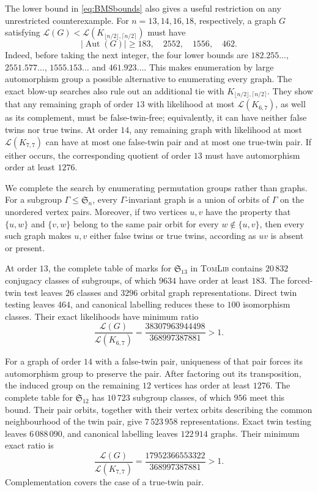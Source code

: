 \documentclass[11pt]{article}
\theoremstyle{definition}
\DeclareMathOperator{\Aut}{Aut}
\newcommand{\Lk}{\mathcal{L}}
\newcommand{\Kbal}{K_{\lfloor n/2\rfloor,\lceil n/2\rceil}}
\begin{document}
The lower bound in \eqref{eq:BMSbounds} also gives a useful restriction on
any unrestricted counterexample.  For $n=13,14,16,18$, respectively, a graph
$G$ satisfying $\Lk(G)<\Lk(\Kbal)$ must have
\[
\lvert\Aut(G)\rvert\ge183,\quad2552,\quad1556,\quad462.
\]
Indeed, before taking the next integer, the four lower bounds are
$182.255\ldots$, $2551.577\ldots$, $1555.153\ldots$ and $461.923\ldots$.
This makes enumeration by large automorphism group a possible alternative to
enumerating every graph.  The exact blow-up searches also rule out an
additional tie with $\Kbal$.  They show that any remaining graph of order
$13$ with likelihood at most $\Lk(K_{6,7})$, as well as its complement, must
be false-twin-free; equivalently, it can have neither false twins nor true
twins.  At order $14$, any remaining graph with likelihood at most
$\Lk(K_{7,7})$ can have at most one false-twin pair and at most one true-twin
pair.  If either occurs, the corresponding quotient of order $13$ must have
automorphism order at least $1276$.

We complete the search by enumerating permutation groups rather than graphs.
For a subgroup $\Gamma\le\mathfrak S_n$, every $\Gamma$-invariant graph is a union of
orbits of $\Gamma$ on the unordered vertex pairs.  Moreover, if two vertices $u,v$
have the property that $\{u,w\}$ and $\{v,w\}$ belong to the same pair orbit
for every $w\notin\{u,v\}$, then every such graph makes $u,v$ either false
twins or true twins, according as $uv$ is absent or present.

At order $13$, the complete table of marks for $\mathfrak S_{13}$ in
\textsc{TomLib} \cite{TomLib} contains $20\,832$ conjugacy classes of
subgroups, of which $9634$ have order at least $183$.  The forced-twin test
leaves $26$ classes and $3296$ orbital graph representations.  Direct twin
testing leaves $464$, and canonical labelling reduces these to $100$
isomorphism classes.  Their exact likelihoods have minimum ratio
\[
\frac{\Lk(G)}{\Lk(K_{6,7})}
=\frac{38307963944498}{368997387881}>1.
\]

For a graph of order $14$ with a false-twin pair, uniqueness of that pair
forces its automorphism group to preserve the pair.  After factoring out its
transposition, the induced group on the remaining $12$ vertices has order at
least $1276$.  The complete table for $\mathfrak S_{12}$ has $10\,723$
subgroup classes, of which $956$ meet this bound.  Their pair orbits, together
with their vertex orbits describing the common neighbourhood of the twin
pair, give $7\,523\,958$ representations.  Exact twin testing leaves
$6\,088\,090$, and canonical labelling leaves $122\,914$ graphs.  Their
minimum exact ratio is
\[
\frac{\Lk(G)}{\Lk(K_{7,7})}
=\frac{17952366553322}{368997387881}>1.
\]
Complementation covers the case of a true-twin pair.
\end{document}
